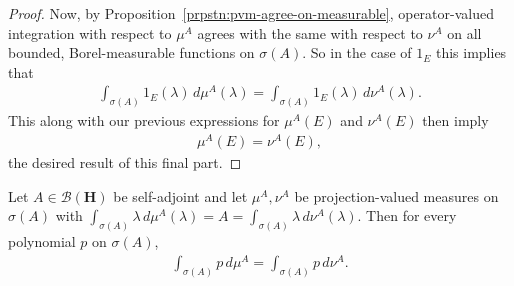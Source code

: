 \begin{proof}
Now, by Proposition~\ref{prpstn:pvm-agree-on-measurable}, operator-valued integration with respect to $\mu^A$ agrees with the same with respect to $\nu^A$ on all bounded, Borel-measurable functions on $\sigma(A)$. So in the case of $1_E$ this implies that
\begin{align}
    \int_{\sigma(A)} 1_E(\lambda) \, d\mu^A(\lambda) = \int_{\sigma(A)} 1_E(\lambda) \, d\nu^A(\lambda).
\end{align}
This along with our previous expressions for $\mu^A(E)$ and $\nu^A(E)$ then imply
\begin{align}
    \mu^A(E) = \nu^A(E),
\end{align}
the desired result of this final part.
\end{proof}

\begin{proposition}
    \label{prpstn:pvm-agree-on-polynomials}
    \leanok
    Let $A \in \mathcal{B}(\mathbf{H})$ be self-adjoint and let $\mu^A, \nu^A$ be projection-valued measures on $\sigma(A)$ with $\int_{\sigma(A)} \lambda \, d\mu^A(\lambda) = A = \int_{\sigma(A)} \lambda \, d\nu^A(\lambda)$. Then for every polynomial $p$ on $\sigma(A)$,
    \begin{align}
        \int_{\sigma(A)} p \, d\mu^A = \int_{\sigma(A)} p \, d\nu^A.
    \end{align}
\end{proposition}
